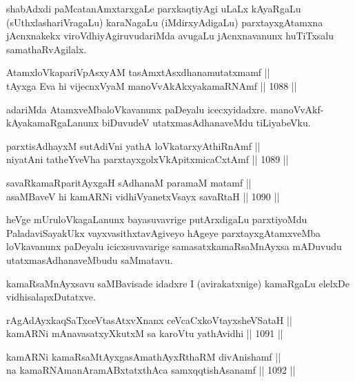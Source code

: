 \begin{artha}
shabAdxdi paMcatanAmxtarxgaLe parxkaqtiyAgi uLaLx kAyaRgaLu (sUthxlashariVragaLu) karaNagaLu (iMdirxyAdigaLu) parxtayxgAtamxna jAcnxnakekx viroVdhiyAgiruvudariMda avugaLu jAcnxnavanunx huTiTxsalu samathaRvAgilalx.
\end{artha}

\begin{shl}
AtamxloVkapariVpAsxyAM tasAmxtAsxdhanamutatxmamf || \\
tAyxga Eva hi vijecnxVyaM manoVvAkAkxyakamaRNAmf \hfill || 1088 ||  
\end{shl}

\begin{artha}
adariMda AtamxveMbaloVkavanunx paDeyalu icecxyidadxre. manoVvAkf-kAyakamaRgaLanunx biDuvudeV utatxmasAdhanaveMdu tiLiyabeVku.
\end{artha}

\begin{shl}
parxtisAdhayxM sutAdiVni yathA loVkatarxyAthiRnAmf || \\
niyatAni tatheYveVha parxtayxgolxVkApitxmicaCxtAmf \hfill || 1089 ||  
\end{shl}
				
\begin{shl}
savaRkamaRparitAyxgaH sAdhanaM paramaM matamf || \\
asaMBaveV hi kamARNi vidhiVyanetxV\s sayx savaRtaH \hfill || 1090 ||  
\end{shl}

\begin{artha}
heVge mUruloVkagaLanunx bayasuvavrige putArxdigaLu parxtiyoMdu PaladaviSayakUkx vayxvasithxtavAgiveyo hAgeye parxtayxgAtamxveMba loVkavanunx paDeyalu icicxsuvavarige samasatxkamaRsaMnAyxsa mADuvudu utatxmasAdhanaveMbudu saMmatavu.
\end{artha}

\begin{artha}
kamaRsaMnAyxsavu saMBavisade idadxre I (avirakatxnige) kamaRgaLu elelxDe vidhisalapxDutatxve.
\end{artha}

\begin{shl}
rAgAdAyxkaqSaTxceVtasAtxvXnanx ceVcaCxkoVtayxsheVSataH || \\
kamARNi mAnavasatxyXkutxM sa karoVtu yathAvidhi \hfill || 1091 ||  
\end{shl}
				
\begin{shl}
kamARNi kamaRsaMtAyxgasAmathAyxRthaRM divAnishamf ||  \\
na kamaRNAmanAramABxtatxthAca samxqqtishAsanamf \hfill || 1092 ||
\end{shl}

